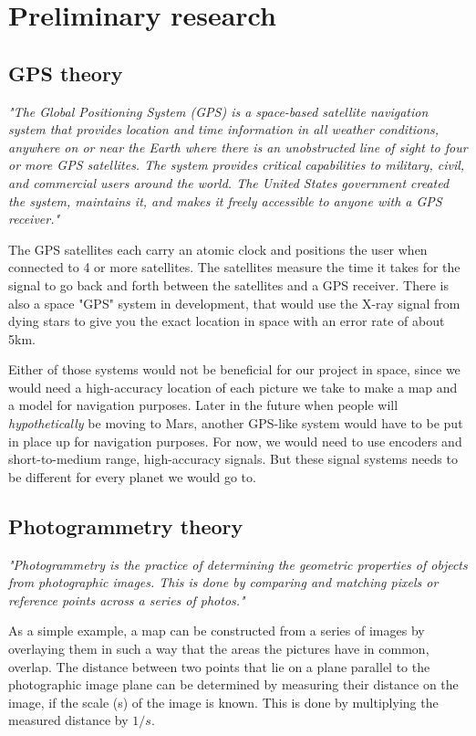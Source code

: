 \clearpage
\section{Preliminary research}

\subsection{GPS theory}

\textit{"The Global Positioning System (GPS) is a space-based satellite navigation system that provides location and time information in all weather conditions, anywhere on or near the Earth where there is an unobstructed line of sight to four or more GPS satellites. The system provides critical capabilities to military, civil, and commercial users around the world. The United States government created the system, maintains it, and makes it freely accessible to anyone with a GPS receiver."\cite{GPS1}}

The GPS satellites each carry an atomic clock and positions the user when connected to 4 or more satellites. The satellites measure the time it takes for the signal to go back and forth between the satellites and a GPS receiver\cite{GPS1}. There is also a space "GPS" system in development, that would use the X-ray signal from dying stars to give you the exact location in space with an error rate of about 5km\cite{GPS2}.

Either of those systems would not be beneficial for our project in space, since we would need a high-accuracy location of each picture we take to make a map and a model for navigation purposes. Later in the future when people will \textit{hypothetically} be moving to Mars, another GPS-like system would have to be put in place up for navigation purposes. For now, we would need to use encoders and short-to-medium range, high-accuracy signals. But these signal systems needs to be different for every planet we would go to.  

\subsection{Photogrammetry theory}

\textit{"Photogrammetry is the practice of determining the geometric properties of objects from photographic images. This is done by comparing and matching pixels or reference points across a series of photos."\cite{Photogrammetry}}

As a simple example, a map can be constructed from a series of images by overlaying them in such a way that the areas the pictures have in common, overlap. The distance between two points that lie on a plane parallel to the photographic image plane can be determined by measuring their distance on the image, if the scale (s) of the image is known. This is done by multiplying the measured distance by $1/s$\cite{photo}.

